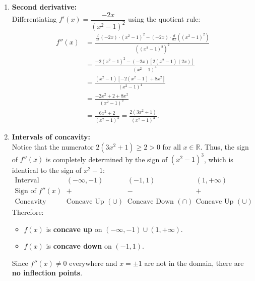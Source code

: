 \documentclass[11pt,a4paper]{article}
\begin{document}
\begin{enumerate}
\begin{enumerate}
          \item \textbf{Second derivative:}\\
                Differentiating $f'(x) = \dfrac{-2x}{(x^2 - 1)^2}$ using the quotient rule:
                \begin{align*}
                  f''(x) & = \frac{\frac{d}{dx}(-2x)\cdot(x^2 - 1)^2 - (-2x)\cdot\frac{d}{dx}\left((x^2 - 1)^2\right)}{\left((x^2 - 1)^2\right)^2} \\
                         & = \frac{-2(x^2 - 1)^2 - (-2x)\left[2(x^2 - 1)(2x)\right]}{(x^2 - 1)^4}                                                  \\
                         & = \frac{(x^2 - 1)\left[-2(x^2 - 1) + 8x^2\right]}{(x^2 - 1)^4}                                                          \\
                         & = \frac{-2x^2 + 2 + 8x^2}{(x^2 - 1)^3}                                                                                  \\
                         & = \boxed{\frac{6x^2 + 2}{(x^2 - 1)^3} = \frac{2(3x^2 + 1)}{(x^2 - 1)^3}}.
                \end{align*}

          \item \textbf{Intervals of concavity:}\\
                Notice that the numerator $2(3x^2 + 1) \ge 2 > 0$ for all $x \in \mathbb{R}$. Thus, the sign of $f''(x)$ is completely determined by the sign of $(x^2 - 1)^3$, which is identical to the sign of $x^2 - 1$:
                \[
                  \begin{array}{c|ccc}
                    \text{Interval}        & (-\infty, -1)             & (-1, 1)                     & (1, +\infty)              \\ \hline
                    \text{Sign of } f''(x) & +                         & -                           & +                         \\
                    \text{Concavity}       & \text{Concave Up } (\cup) & \text{Concave Down } (\cap) & \text{Concave Up } (\cup)
                  \end{array}
                \]
                Therefore:
                \begin{itemize}
                  \item $f(x)$ is \textbf{concave up} on $\boxed{(-\infty, -1) \cup (1, +\infty)}$.
                  \item $f(x)$ is \textbf{concave down} on $\boxed{(-1, 1)}$.
                \end{itemize}
                Since $f''(x) \ne 0$ everywhere and $x = \pm 1$ are not in the domain, there are \textbf{no inflection points}.


\end{enumerate}
\end{enumerate}
\end{document}
